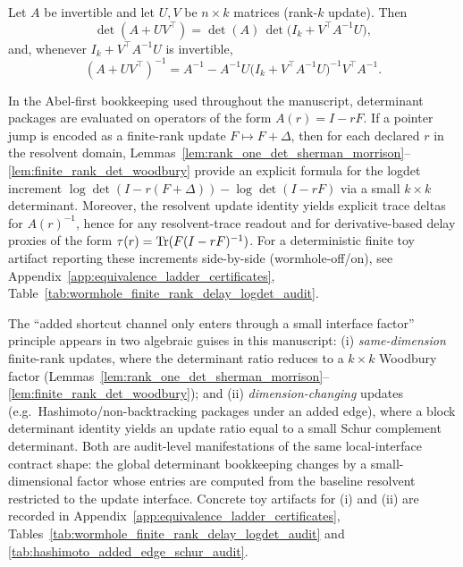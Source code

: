 \begin{lemma}\label{lem:finite_rank_det_woodbury}
\MathTag Let $A$ be invertible and let $U,V$ be $n\times k$ matrices (rank-$k$ update).
Then
\[
\det(A+U V^\top)=\det(A)\,\det\!\bigl(I_k+V^\top A^{-1}U\bigr),
\]
and, whenever $I_k+V^\top A^{-1}U$ is invertible,
\[
(A+U V^\top)^{-1}=A^{-1}-A^{-1}U\bigl(I_k+V^\top A^{-1}U\bigr)^{-1}V^\top A^{-1}.
\]
\end{lemma}

\begin{remark}\label{rem:finite_rank_logdet_resolvent_delta}
\AuditTag In the Abel-first bookkeeping used throughout the manuscript, determinant packages are evaluated on operators of the form $A(r)=I-rF$.
If a pointer jump is encoded as a finite-rank update $F\mapsto F+\Delta$, then for each declared $r$ in the resolvent domain,
Lemmas~\ref{lem:rank_one_det_sherman_morrison}--\ref{lem:finite_rank_det_woodbury} provide an explicit formula for the logdet increment
$\log\det(I-r(F+\Delta))-\log\det(I-rF)$ via a small $k\times k$ determinant.
Moreover, the resolvent update identity yields explicit trace deltas for $A(r)^{-1}$, hence for any resolvent-trace readout
and for derivative-based delay proxies of the form $\tau(r)=\mathrm{Tr}(F(I-rF)^{-1})$.
For a deterministic finite toy artifact reporting these increments side-by-side (wormhole-off/on), see Appendix~\ref{app:equivalence_ladder_certificates},
Table~\ref{tab:wormhole_finite_rank_delay_logdet_audit}.
\end{remark}

\begin{remark}\label{rem:local_interface_factorization_contract}
\AuditTag The ``added shortcut channel only enters through a small interface factor'' principle appears in two algebraic guises in this manuscript:
(i) \emph{same-dimension} finite-rank updates, where the determinant ratio reduces to a $k\times k$ Woodbury factor
(Lemmas~\ref{lem:rank_one_det_sherman_morrison}--\ref{lem:finite_rank_det_woodbury});
and (ii) \emph{dimension-changing} updates (e.g.\ Hashimoto/non-backtracking packages under an added edge), where a block determinant identity yields
an update ratio equal to a small Schur complement determinant.
Both are audit-level manifestations of the same local-interface contract shape: the global determinant bookkeeping changes by a small-dimensional factor
whose entries are computed from the baseline resolvent restricted to the update interface.
Concrete toy artifacts for (i) and (ii) are recorded in Appendix~\ref{app:equivalence_ladder_certificates},
Tables~\ref{tab:wormhole_finite_rank_delay_logdet_audit} and \ref{tab:hashimoto_added_edge_schur_audit}.
\end{remark}
